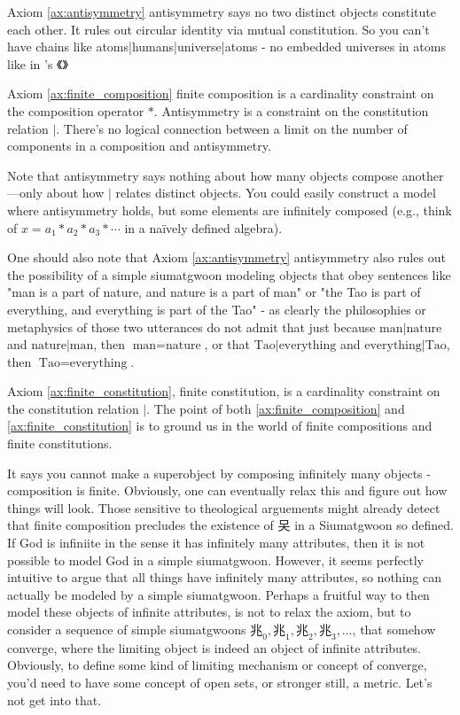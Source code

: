Axiom \ref{ax:antisymmetry} antisymmetry says no two distinct objects constitute each other. It rules out circular identity via mutual constitution. So you can't have chains like atoms|humans|universe|atoms - no embedded universes in atoms like in 's 《》 

Axiom \ref{ax:finite_composition} finite composition is a cardinality constraint on the composition operator $*$. Antisymmetry is a constraint on the constitution relation $|$. There's no logical connection between a limit on the number of components in a composition and antisymmetry.

Note that antisymmetry says nothing about how many objects compose another—only about how $|$ relates distinct objects. You could easily construct a model where antisymmetry holds, but some elements are infinitely composed (e.g., think of $x = a_1 * a_2 * a_3 * \cdots$ in a naïvely defined algebra).

One should also note that Axiom \ref{ax:antisymmetry} antisymmetry also rules out the possibility of a simple siumatgwoon modeling objects that obey sentences like "man is a part of nature, and nature is a part of man" or "the Tao is part of everything, and everything is part of the Tao" - as clearly the philosophies or metaphysics of those two utterances do not admit that just because $\text{man} | \text{nature}$ and $\text{nature} | \text{man}$, then $\text{man} = \text{nature}$, or that $\text{Tao} | \text{everything}$ and $\text{everything} | \text{Tao}$, then $\text{Tao} = \text{everything}$. 


Axiom \ref{ax:finite_constitution}, finite constitution, is a cardinality constraint on the constitution relation $|$. The point of both \ref{ax:finite_composition} and \ref{ax:finite_constitution} is to ground us in the world of finite compositions and finite constitutions. 

It says you cannot make a superobject by composing infinitely many objects - composition is finite. Obviously, one can eventually relax this and figure out how things will look. Those sensitive to theological arguements might already detect that finite composition precludes the existence of 㕦 in a Siumatgwoon so defined. If God is infiniite in the sense it has infinitely many attributes, then it is not possible to model God in a simple siumatgwoon. However, it seems perfectly intuitive to argue that all things have infinitely many attributes, so nothing can actually be modeled by a simple siumatgwoon. Perhaps a fruitful way to then model these objects of infinite attributes, is not to relax the axiom, but to consider a sequence of simple siumatgwoons $\text{兆}_0,\text{兆}_1, \text{兆}_2, \text{兆}_3, \ldots$, that somehow converge, where the limiting object is indeed an object of infinite attributes. Obviously, to define some kind of limiting mechanism or concept of converge, you'd need to have some concept of open sets, or stronger still, a metric. Let's not get into that. 


